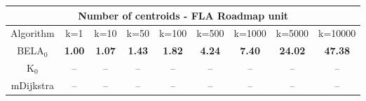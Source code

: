 \begin{tabular}{c|cccccccc}\toprule
\multicolumn{9}{c}{Number of centroids - FLA Roadmap unit}\\ \midrule
Algorithm & k=1 & k=10 & k=50 & k=100 & k=500 & k=1000 & k=5000 & k=10000 \\ \midrule
BELA$_0$ & \textbf{1.00} & \textbf{1.07} & \textbf{1.43} & \textbf{1.82} & \textbf{4.24} & \textbf{7.40} & \textbf{24.02} & \textbf{47.38} \\
K$_0$ & -- & -- & -- & -- & -- & -- & -- & -- \\
mDijkstra & -- & -- & -- & -- & -- & -- & -- & -- \\ \bottomrule 
\end{tabular}
